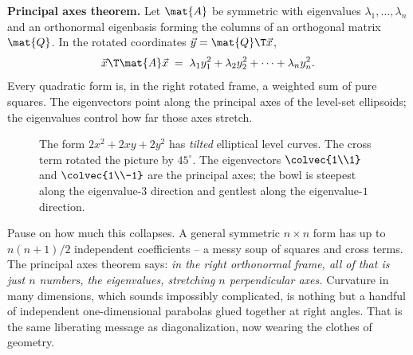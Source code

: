 \begin{formalbox}
\label{ch36:thm-principal-axes}
\textbf{Principal axes theorem.} Let $\mat{A}$ be symmetric with eigenvalues $\lambda_1,\dots,\lambda_n$ and an
orthonormal eigenbasis forming the columns of an orthogonal matrix $\mat{Q}$. In the
rotated coordinates $\vec{y}=\mat{Q}\T\vec{x}$,
\[
  \vec{x}\T\mat{A}\vec{x} \;=\; \lambda_1 y_1^2 + \lambda_2 y_2^2 + \cdots + \lambda_n y_n^2.
\]
Every quadratic form is, in the right rotated frame, a weighted sum of pure squares.
The eigenvectors point along the principal axes of the level-set ellipsoids; the
eigenvalues control how far those axes stretch.
\end{formalbox}

\begin{figure}[H]
\centering
{}
\caption{The form $2x^2+2xy+2y^2$ has \emph{tilted} elliptical level curves. The
cross term rotated the picture by $45^\circ$. The eigenvectors $\colvec{1\\1}$ and
$\colvec{1\\-1}$ are the principal axes; the bowl is steepest along the eigenvalue-$3$
direction and gentlest along the eigenvalue-$1$ direction.}
\label{ch36:fig-tilted}
\end{figure}

\begin{aestheticbox}
Pause on how much this collapses. A general symmetric $n\times n$ form has up to
$n(n+1)/2$ independent coefficients -- a messy soup of squares and cross terms. The
principal axes theorem says: \emph{in the right orthonormal frame, all of that is
just $n$ numbers, the eigenvalues, stretching $n$ perpendicular axes.} Curvature in
many dimensions, which sounds impossibly complicated, is nothing but a handful of
independent one-dimensional parabolas glued together at right angles. That is the
same liberating message as diagonalization, now wearing the clothes of geometry.
\end{aestheticbox}

